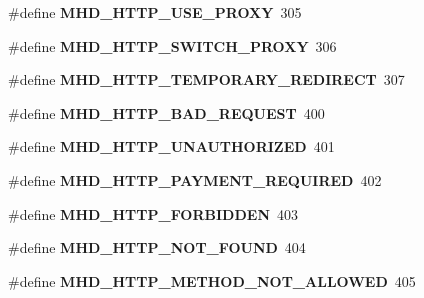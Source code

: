 \begin{DoxyCompactItemize}
\item 
\hypertarget{group__httpcode_ga07741dfffa9e82f116167ff8d7cfcc12}{\#define {\bfseries \-M\-H\-D\-\_\-\-H\-T\-T\-P\-\_\-\-U\-S\-E\-\_\-\-P\-R\-O\-X\-Y}~305}\label{group__httpcode_ga07741dfffa9e82f116167ff8d7cfcc12}

\item 
\hypertarget{group__httpcode_ga5df791de432f89f9f962c1f21db6acc4}{\#define {\bfseries \-M\-H\-D\-\_\-\-H\-T\-T\-P\-\_\-\-S\-W\-I\-T\-C\-H\-\_\-\-P\-R\-O\-X\-Y}~306}\label{group__httpcode_ga5df791de432f89f9f962c1f21db6acc4}

\item 
\hypertarget{group__httpcode_gae0010e43378656d7ad3b36c3fc1ceac7}{\#define {\bfseries \-M\-H\-D\-\_\-\-H\-T\-T\-P\-\_\-\-T\-E\-M\-P\-O\-R\-A\-R\-Y\-\_\-\-R\-E\-D\-I\-R\-E\-C\-T}~307}\label{group__httpcode_gae0010e43378656d7ad3b36c3fc1ceac7}

\item 
\hypertarget{group__httpcode_gaedddaa9fd1852151d9748836ceaf3f9a}{\#define {\bfseries \-M\-H\-D\-\_\-\-H\-T\-T\-P\-\_\-\-B\-A\-D\-\_\-\-R\-E\-Q\-U\-E\-S\-T}~400}\label{group__httpcode_gaedddaa9fd1852151d9748836ceaf3f9a}

\item 
\hypertarget{group__httpcode_ga8d6ffe91a95aae60f81c49a272b5d4de}{\#define {\bfseries \-M\-H\-D\-\_\-\-H\-T\-T\-P\-\_\-\-U\-N\-A\-U\-T\-H\-O\-R\-I\-Z\-E\-D}~401}\label{group__httpcode_ga8d6ffe91a95aae60f81c49a272b5d4de}

\item 
\hypertarget{group__httpcode_ga274eb8971412d811a9373c6ebfdc54cf}{\#define {\bfseries \-M\-H\-D\-\_\-\-H\-T\-T\-P\-\_\-\-P\-A\-Y\-M\-E\-N\-T\-\_\-\-R\-E\-Q\-U\-I\-R\-E\-D}~402}\label{group__httpcode_ga274eb8971412d811a9373c6ebfdc54cf}

\item 
\hypertarget{group__httpcode_gafdacf3884f8217638c00d8fd937b1c86}{\#define {\bfseries \-M\-H\-D\-\_\-\-H\-T\-T\-P\-\_\-\-F\-O\-R\-B\-I\-D\-D\-E\-N}~403}\label{group__httpcode_gafdacf3884f8217638c00d8fd937b1c86}

\item 
\hypertarget{group__httpcode_ga4580ddccae12e5c9041967a3fc5e144d}{\#define {\bfseries \-M\-H\-D\-\_\-\-H\-T\-T\-P\-\_\-\-N\-O\-T\-\_\-\-F\-O\-U\-N\-D}~404}\label{group__httpcode_ga4580ddccae12e5c9041967a3fc5e144d}

\item 
\hypertarget{group__httpcode_gaa8ad6a468743f7cb30bcc372a0db2eb5}{\#define {\bfseries \-M\-H\-D\-\_\-\-H\-T\-T\-P\-\_\-\-M\-E\-T\-H\-O\-D\-\_\-\-N\-O\-T\-\_\-\-A\-L\-L\-O\-W\-E\-D}~405}\label{group__httpcode_gaa8ad6a468743f7cb30bcc372a0db2eb5}


\end{DoxyCompactItemize}
